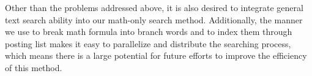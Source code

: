 Other than the problems addressed above, it is also desired to integrate general text search ability into our math-only search method. 
Additionally, the manner we use to break math formula into branch words and to index them through posting list makes it easy to parallelize and distribute the searching process,
which means there is a large potential for future efforts to improve the efficiency of this method.
